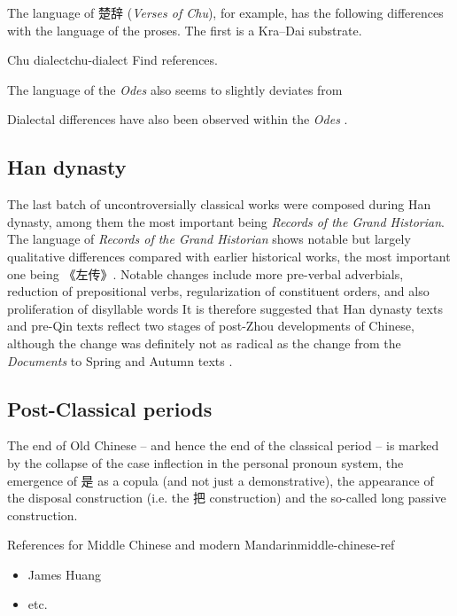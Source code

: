 \documentclass[UTF8, a4paper, oneside, scheme=plain, 12pt]{ctexrep}
\newcommand*{\citepages}[1]{pp.~{#1}}
\newcommand{\form}[1]{\emph{#1}}
\newcommand{\work}[1]{\textit{#1}}
\begin{document}
The language of 楚辞 (\work{Verses of Chu}), for example,
has the following differences with the language of the proses. 
The first is a Kra–Dai substrate.

\begin{todobox}{Chu dialect}{chu-dialect}
    Find references.
\end{todobox}

The language of the \work{Odes} also seems to slightly deviates from 

Dialectal differences have also been observed within the \work{Odes} \citep{list2017vowel}.



\subsection{Han dynasty}\label{sec:introduction.history.han}

The last batch of uncontroversially classical works were composed during Han dynasty,
among them the most important being \work{Records of the Grand Historian}.
The language of \form{Records of the Grand Historian} shows notable but largely qualitative differences
compared with earlier historical works,
the most important one being 《左传》.
Notable changes include more pre-verbal adverbials,
reduction of prepositional verbs,
regularization of constituent orders,
and also proliferation of disyllable words
It is therefore suggested that Han dynasty texts and pre-Qin texts 
reflect two stages of post-Zhou developments of Chinese,
although the change was definitely not as radical as the change 
from the \form{Documents} to Spring and Autumn texts 
\citep[\citepages{260-264}]{he2005shiji}.

\subsection{Post-Classical periods}

The end of Old Chinese -- and hence the end of the classical period --
is marked by the collapse of the case inflection in the personal pronoun system,
the emergence of 是 as a copula (and not just a demonstrative),
the appearance of the disposal construction (i.e. the 把 construction)
and the so-called long passive construction.

\begin{todobox}{References for Middle Chinese and modern Mandarin}{middle-chinese-ref}
    \begin{itemize}
        \item James Huang
        \item etc.
    \end{itemize}
\end{todobox}
\end{document}
